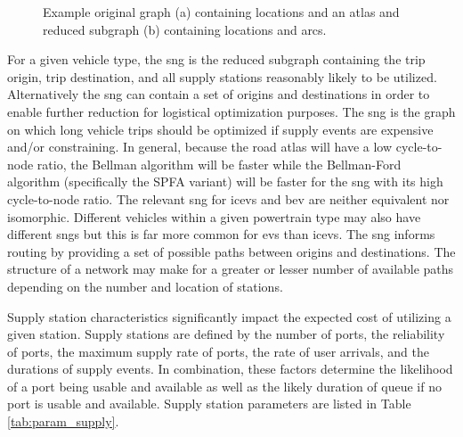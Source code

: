 \documentclass[11pt]{article}
\begin{document}
\begin{multicols}{2}
\begin{figure}[H]
\begin{subfigure}[t]{.5\linewidth}
	\end{subfigure}
	\caption{Example original graph (a) containing locations and an atlas and reduced subgraph (b) containing locations and arcs.}
	\label{fig:reduced_subgraph}
\end{figure}

For a given vehicle type, the \gls{sng} is the reduced subgraph containing the trip origin, trip destination, and all supply stations reasonably likely to be utilized. Alternatively the \gls{sng} can contain a set of origins and destinations in order to enable further reduction for logistical optimization purposes. The \gls{sng} is the graph on which long vehicle trips should be optimized if supply events are expensive and/or constraining. In general, because the road atlas will have a low cycle-to-node ratio, the Bellman algorithm will be faster while the Bellman-Ford algorithm (specifically the SPFA variant) will be faster for the \gls{sng} with its high cycle-to-node ratio. The relevant \gls{sng} for \glspl{icev} and \gls{bev} are neither equivalent nor isomorphic. Different vehicles within a given powertrain type may also have different \glspl{sng} but this is far more common for \glspl{ev} than \glspl{icev}. The \gls{sng} informs routing by providing a set of possible paths between origins and destinations. The structure of a network may make for a greater or lesser number of available paths depending on the number and location of stations.

Supply station characteristics significantly impact the expected cost of utilizing a given station. Supply stations are defined by the number of ports, the reliability of ports, the maximum supply rate of ports, the rate of user arrivals, and the durations of supply events. In combination, these factors determine the likelihood of a port being usable and available as well as the likely duration of queue if no port is usable and available. Supply station parameters are listed in Table \ref{tab:param_supply}.


\end{multicols}
\end{document}
